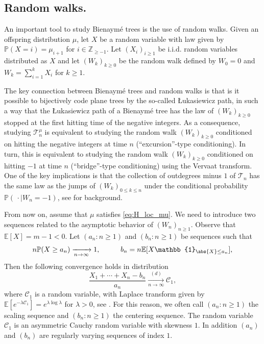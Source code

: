 \documentclass[a4paper,11pt]{article}
\DeclareRobustCommand{\P}{\mathbb{P}}
\DeclareRobustCommand{\E}{\mathbb{E}}
\DeclareRobustCommand{\to}{\xrightarrow[n\rightarrow \infty]{}}
\DeclareRobustCommand{\Z}{\mathbb{Z}}
\DeclareRobustCommand{\Cauchy}{\mathcal{C}_1}
\DeclareRobustCommand{\dist}{\xrightarrow[n \rightarrow \infty]{(d)}}
\begin{document}
\subsection{Random walks.}
\label{ssec:RW}An important tool to study Bienaymé trees is the use of random walks. Given an offspring distribution $\mu$, let $X$ be a random variable with law given by $\P(X = i) = \mu_{i+1}$ for $i \in \Z_{\geq -1}$. Let $(X_i)_{i\geq 1}$ be i.i.d. random variables distributed as $X$ and let $(W_{k})_{k \geq 0}$ be the random walk defined by $W_{0}=0$ and $W_k= \sum_{i = 1}^k X_i$ for $k \geq 1$.

The key connection between Bienaymé trees and random walks is that is it possible to bijectively code plane trees by the so-called \L ukasiewicz path, in such a way that the \L ukasiewicz path of a Bienaymé tree has the law of $(W_{k})_{k \geq 0}$ stopped at the first hitting time of the negative integers. As a consequence, studying  $ \mathcal{T}^{\mu}_{n}$ is equivalent to studying the random walk $(W_{k})_{k \geq 0}$ conditioned on hitting the negative integers at time $n$ (``excursion''-type conditioning). In turn, this is equivalent to studying the random walk $(W_{k})_{k \geq 0}$ conditioned on hitting $-1$ at time $n$ (``bridge''-type conditioning) using the Vervaat transform. One of the key implications is that the collection of outdegrees minus $1$ of $ \mathcal{T}_{n}$ has the same law as the jumps of $(W_{k})_{0 \leq k \leq n}$ under the conditional probability $\P(\, \cdot \mid W_{n}=-1)$, see \cite[Sec.~6.1]{Pit06} for background.


From now on, assume that $\mu$ satisfies \eqref{eq:H_loc_mu}. We  need to introduce two sequences related to the asymptotic behavior of $(W_{n})_{n \geq 1}$.  Observe that $\E[X] = m-1 <0$. Let $(a_n:n\geq 1)$ and $(b_n:n\geq 1)$ be sequences such that
        \begin{equation}
            n\P(X \geq a_n) \to 1, \hspace{1cm} b_n=n\E[X\mathbb{1}_{\abs{X}\leq a_n}],
        \end{equation}
Then the following convergence holds in distribution
        \begin{equation}\label{eq:conv to C_1}
            \frac{X_1+ \cdots +X_n-b_n}{a_n} \dist \Cauchy,
        \end{equation}
        where $\Cauchy$ is a random variable, with Laplace transform given by $\E[e^{-\lambda \Cauchy}] = e^{\lambda \log{\lambda}}$ for $\lambda>0$, see \cite[Chap. IX.8 and Eq. (8.15) p.315]{feller-vol-2}.   For this reason, we often call $(a_n:n\geq 1)$ the scaling sequence and $(b_n:n\geq 1)$ the centering sequence.  The random variable $\Cauchy$ is an asymmetric Cauchy random variable with skewness $1$. In addition $(a_{n})$ and $(b_{n})$ are regularly varying sequences of index $1$.
        
\end{document}
